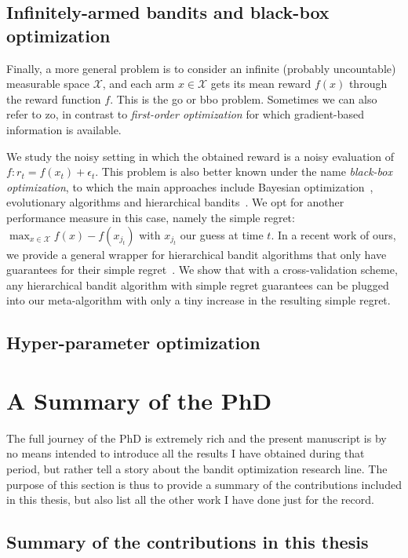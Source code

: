 \subsection{Infinitely-armed bandits and black-box optimization}

Finally, a more general problem is to consider an infinite (probably uncountable) measurable space $\mathcal{X}$, and each arm $x\in\mathcal{X}$ gets its mean reward $f(x)$ through the reward function $f$. This is the \gls{go} or \gls{bbo} problem. Sometimes we can also refer to \gls{zo}, in contrast to \emph{first-order optimization} for which gradient-based information is available.

We study the noisy setting in which the obtained reward is a noisy evaluation of $f: r_t = f(x_t) + \epsilon_t$. This problem is also better known under the name \emph{black-box optimization}, to which the main approaches include Bayesian optimization~\citep{brochu2010bayesian}, evolutionary algorithms and hierarchical bandits~\citep{bubeck2010x}. We opt for another performance measure in this case, namely the simple regret: $\max_{x\in\mathcal{X}} f(x) - f(x_{j_t})$ with $x_{j_t}$ our guess at time $t$. In a recent work of ours, we provide a general wrapper for hierarchical bandit algorithms that only have guarantees for their simple regret~\cite{shang2019adaptive}. We show that with a cross-validation scheme, any hierarchical bandit algorithm with simple regret guarantees can be plugged into our meta-algorithm with only a tiny increase in the resulting simple regret.

\subsection{Hyper-parameter optimization}


\section{A Summary of the PhD}\label{sec:intro.contributions}

The full journey of the PhD is extremely rich and the present manuscript is by no means intended to introduce all the results I have obtained during that period, but rather tell a story about the bandit optimization research line. The purpose of this section is thus to provide a summary of the contributions included in this thesis, but also list all the other work I have done just for the record.

\subsection{Summary of the contributions in this thesis}\label{sec:intro.contributions.summary}

